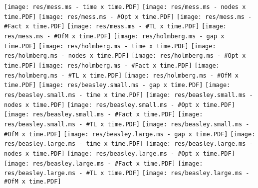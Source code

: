 	\texttt{[image: res/mess.ms - time x time.PDF]} 
	\texttt{[image: res/mess.ms - nodes x time.PDF]} 
	\texttt{[image: res/mess.ms - \#Opt x time.PDF]} 
	\texttt{[image: res/mess.ms - \#Fact x time.PDF]} 
	\texttt{[image: res/mess.ms - \#TL x time.PDF]} 
	\texttt{[image: res/mess.ms - \#OfM x time.PDF]} 
	\texttt{[image: res/holmberg.ms - gap x time.PDF]} 
	\texttt{[image: res/holmberg.ms - time x time.PDF]} 
	\texttt{[image: res/holmberg.ms - nodes x time.PDF]} 
	\texttt{[image: res/holmberg.ms - \#Opt x time.PDF]} 
	\texttt{[image: res/holmberg.ms - \#Fact x time.PDF]} 
	\texttt{[image: res/holmberg.ms - \#TL x time.PDF]} 
	\texttt{[image: res/holmberg.ms - \#OfM x time.PDF]} 
	\texttt{[image: res/beasley.small.ms - gap x time.PDF]} 
	\texttt{[image: res/beasley.small.ms - time x time.PDF]} 
	\texttt{[image: res/beasley.small.ms - nodes x time.PDF]} 
	\texttt{[image: res/beasley.small.ms - \#Opt x time.PDF]} 
	\texttt{[image: res/beasley.small.ms - \#Fact x time.PDF]} 
	\texttt{[image: res/beasley.small.ms - \#TL x time.PDF]} 
	\texttt{[image: res/beasley.small.ms - \#OfM x time.PDF]} 
	\texttt{[image: res/beasley.large.ms - gap x time.PDF]} 
	\texttt{[image: res/beasley.large.ms - time x time.PDF]} 
	\texttt{[image: res/beasley.large.ms - nodes x time.PDF]} 
	\texttt{[image: res/beasley.large.ms - \#Opt x time.PDF]} 
	\texttt{[image: res/beasley.large.ms - \#Fact x time.PDF]} 
	\texttt{[image: res/beasley.large.ms - \#TL x time.PDF]} 
	\texttt{[image: res/beasley.large.ms - \#OfM x time.PDF]} 
